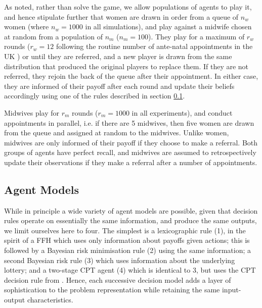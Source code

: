 As noted, rather than solve the game, we allow populations of agents to play it, and hence stipulate further that women are drawn in order from a queue of \(n_{w}\) women (where \(n_{w}=1000\) in all simulations), and play against a midwife chosen at random from a population of \(n_{m}\) (\(n_{m}=100\)). They play for a maximum of \(r_{w}\) rounds (\(r_{w}=12\) following the routine number of ante-natal appointments in the UK \citep{NICE2010a}) or until they are referred, and a new player is drawn from the same distribution that produced the original players to replace them. If they are not referred, they rejoin the back of the queue after their appointment. In either case, they are informed of their payoff after each round and update their beliefs accordingly using one of the rules described in section \ref{sub:the_agents}.

Midwives play for \(r_{m}\) rounds (\(r_{m}=1000\) in all experiments), and conduct appointments in parallel, i.e. if there are 5 midwives, then five women are drawn from the queue and assigned at random to the midwives. 
Unlike women, midwives are only informed of their payoff if they choose to make a referral. Both groups of agents have perfect recall, and midwives are assumed to retrospectively update their observations if they make a referral after a number of appointments.



\subsection{Agent Models}
\label{sub:the_agents}

While in principle a wide variety of agent models are possible, given that decision rules operate on essentially the same information, and produce the same outputs, we limit ourselves here to four. The simplest is a lexicographic rule (1), in the spirit of a \ac{FFH} \citep{Gigerenzer2004} which uses only information about payoffs given actions; this is followed by a Bayesian risk minimisation rule (2) using the same information; a second Bayesian risk rule (3) which uses information about the underlying lottery; and a two-stage \ac{CPT} \citep{Hau2008} agent (4) which is identical to 3, but uses the \ac{CPT} decision rule from \cite{Tversky1992}. Hence, each successive decision model adds a layer of sophistication to the problem representation while retaining the same input-output characteristics.

